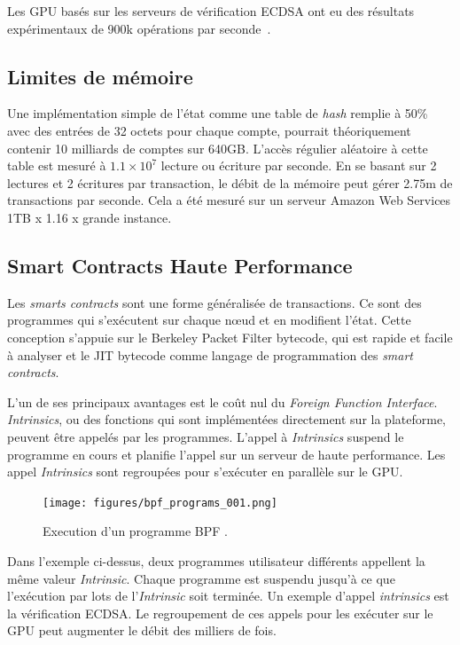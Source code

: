 \documentclass[12pt]{article}
\begin{document}
Les GPU basés sur les serveurs de vérification ECDSA ont eu des résultats expérimentaux de 900k opérations par seconde~\cite{gpuecc}.
\subsection{Limites de mémoire}
Une implémentation simple de l'état comme une table de \textit{hash} remplie à 50\% avec des entrées de 32 octets pour chaque compte, pourrait théoriquement contenir 10 milliards de comptes sur 640GB. L'accès régulier aléatoire à cette table est mesuré à \(1.1 \times 10^7\) lecture ou écriture par seconde. En se basant sur 2 lectures et 2 écritures par transaction, le débit de la mémoire peut gérer 2.75m de transactions par seconde. Cela a été mesuré sur un serveur Amazon Web Services 1TB x 1.16 x grande instance.

\subsection{Smart Contracts Haute Performance}\label{sec:smartcontracts}

Les \textit{smarts contracts} sont une forme généralisée de transactions. Ce sont des programmes qui s'exécutent sur chaque nœud et en modifient l'état. Cette conception s'appuie sur le Berkeley Packet Filter bytecode, qui est rapide et facile à analyser et le JIT bytecode comme langage de programmation des \textit{smart contracts}.

L'un de ses principaux avantages est le coût nul du \textit{Foreign Function Interface}. \textit{Intrinsics}, ou  des fonctions qui sont implémentées directement sur la plateforme, peuvent être appelés par  les programmes. L'appel à \textit{Intrinsics} suspend le programme en cours et planifie l'appel sur un serveur de haute performance. Les appel \textit{Intrinsics} sont regroupées pour s'exécuter en parallèle sur le GPU.

\begin{figure}
  \begin{center}
    \centering
    \texttt{[image: figures/bpf\_programs\_001.png]}
    \caption[Fig 11]{Execution d'un programme BPF .\label{fig_11}}
  \end{center}
\end{figure}

Dans l'exemple ci-dessus, deux programmes utilisateur différents appellent la même valeur \textit{Intrinsic}. Chaque programme est suspendu jusqu'à ce que l'exécution par lots de l'\textit{Intrinsic} soit terminée. Un exemple d'appel \textit{intrinsics} est la vérification ECDSA. Le regroupement de ces appels pour les exécuter sur le GPU peut augmenter le débit des milliers de fois.
\end{document}
